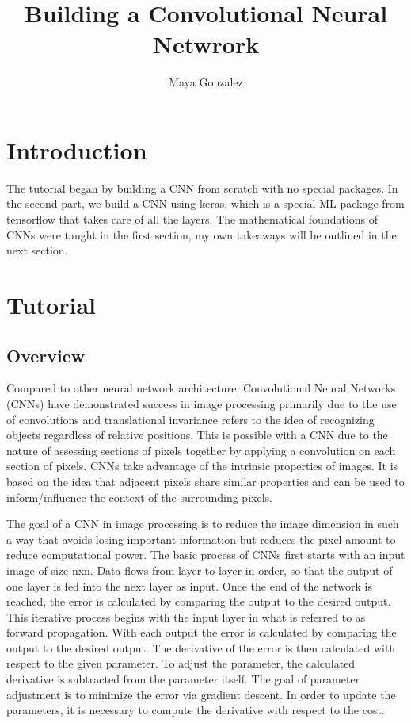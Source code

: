 \documentclass[10pt,twocolumn]{article}
\title{Building a Convolutional Neural Netwrork}
\author{Maya Gonzalez}
\affiliation{Occidental College}
\begin{document}
\maketitle

\section{Introduction}
The tutorial began by building a CNN from scratch with no special packages. In the second part, we build a CNN using keras, which is a special ML package from tensorflow that takes care of all the layers. 
The mathematical foundations of CNNs were taught in the first section, my own takeaways will be outlined in the next section. 

\section{Tutorial}
\subsection{Overview}
Compared to other neural network architecture, Convolutional Neural Networks (CNNs) have demonstrated success in image processing primarily due to the use of convolutions and translational invariance refers to the idea of recognizing objects regardless of relative positions. This is possible with a CNN due to the nature of assessing sections of pixels together by applying a convolution on each section of pixels. CNNs take advantage of the intrinsic properties of images. It is based on the idea that adjacent pixels share similar properties and can be used to inform/influence the context of the surrounding pixels. 

The goal of a CNN in image processing is to reduce the image dimension in such a way that avoids losing important information but reduces the pixel amount to reduce computational power. The basic process of CNNs first starts with an input image of size nxn. Data flows from layer to layer in order, so that the output of one layer is fed into the next layer as input. Once the end of the network is reached, the error is calculated by comparing the output to the desired output. This iterative process begins with the input layer in what is referred to as forward propagation. With each output the error is calculated by comparing the output to the desired output. The derivative of the error is then calculated with respect to the given parameter. To adjust the parameter, the calculated derivative is subtracted from the parameter itself. The goal of parameter adjustment is to minimize the error via gradient descent. In order to update the parameters, it is necessary to compute the derivative with respect to the cost. 
\end{document}
